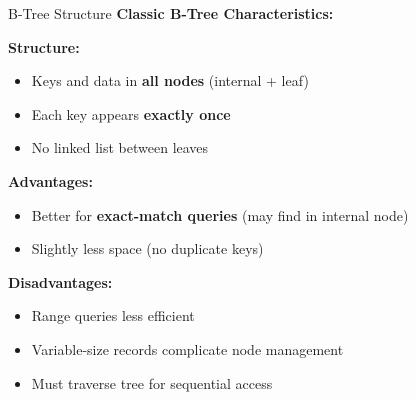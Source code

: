 \documentclass[aspectratio=169]{beamer}
\begin{document}
\begin{frame}{B-Tree Structure}
  \textbf{Classic B-Tree Characteristics:}

  \vspace{0.3cm}
  \textbf{Structure:}
  \begin{itemize}
    \item Keys and data in \textbf{all nodes} (internal + leaf)
    \item Each key appears \textbf{exactly once}
    \item No linked list between leaves
  \end{itemize}

  \vspace{0.3cm}
  \textbf{Advantages:}
  \begin{itemize}
    \item Better for \textbf{exact-match queries} (may find in internal node)
    \item Slightly less space (no duplicate keys)
  \end{itemize}

  \vspace{0.3cm}
  \textbf{Disadvantages:}
  \begin{itemize}
    \item Range queries less efficient
    \item Variable-size records complicate node management
    \item Must traverse tree for sequential access
  \end{itemize}
\end{frame}
\end{document}
